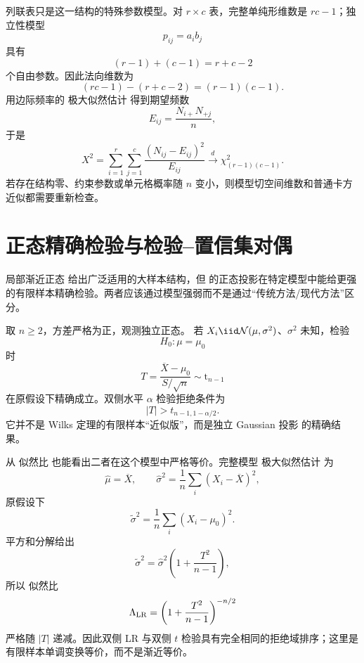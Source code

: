 \begin{workedexample}[列联表独立性的法向维数]
列联表只是这一结构的特殊参数模型。对 $r\times c$ 表，完整单纯形维数是 $rc-1$；独立性模型
\[
 p_{ij}=a_ib_j
\]
具有
\[
 (r-1)+(c-1)=r+c-2
\]
个自由参数。因此法向维数为
\[
 (rc-1)-(r+c-2)=(r-1)(c-1).
\]
用边际频率的 极大似然估计 得到期望频数
\[
 E_{ij}=\frac{N_{i+}N_{+j}}{n},
\]
于是
\begin{equation*}X^2
 =\sum_{i=1}^r\sum_{j=1}^c
 \frac{(N_{ij}-E_{ij})^2}{E_{ij}}
 \xrightarrow{d}\chi^2_{(r-1)(c-1)}.
\end{equation*}
若存在结构零、约束参数或单元格概率随 $n$ 变小，则模型切空间维数和普通卡方近似都需要重新检查。
\end{workedexample}

\section{正态精确检验与检验--置信集对偶}

局部渐近正态 给出广泛适用的大样本结构，但  的正态投影在特定模型中能给更强的有限样本精确检验。两者应该通过模型强弱而不是通过“传统方法/现代方法”区分。

\begin{proposition}
取 $n\ge2$，方差严格为正，观测独立正态。
若 $X_i\iid\mathcal N(\mu,\sigma^2)$、$\sigma^2$ 未知，检验
\[
 H_0:\mu=\mu_0
\]
时
\[
 T
 =\frac{\overline X-\mu_0}{S/\sqrt n}
 \sim\mathrm t_{n-1}
\]
在原假设下精确成立。双侧水平 $\alpha$ 检验拒绝条件为
\[
 |T|>t_{n-1,1-\alpha/2}.
\]
它并不是 Wilks 定理的有限样本“近似版”，而是独立 Gaussian 投影 的精确结果。

从 似然比 也能看出二者在这个模型中严格等价。完整模型 极大似然估计 为
\[
 \widehat\mu=\overline X,
 \qquad
 \widehat\sigma^2=\frac1n\sum_i(X_i-\overline X)^2,
\]
原假设下
\[
 \widetilde\sigma^2=\frac1n\sum_i(X_i-\mu_0)^2.
\]
平方和分解给出
\[
 \widetilde\sigma^2
 =\widehat\sigma^2
 \left(1+\frac{T^2}{n-1}\right),
\]
所以 似然比
\[
 \Lambda_{\rm LR}
 =\left(
 1+\frac{T^2}{n-1}
 \right)^{-n/2}
\]
严格随 $|T|$ 递减。因此双侧 LR 与双侧 $t$ 检验具有完全相同的拒绝域排序；这里是有限样本单调变换等价，而不是渐近等价。
\end{proposition}

